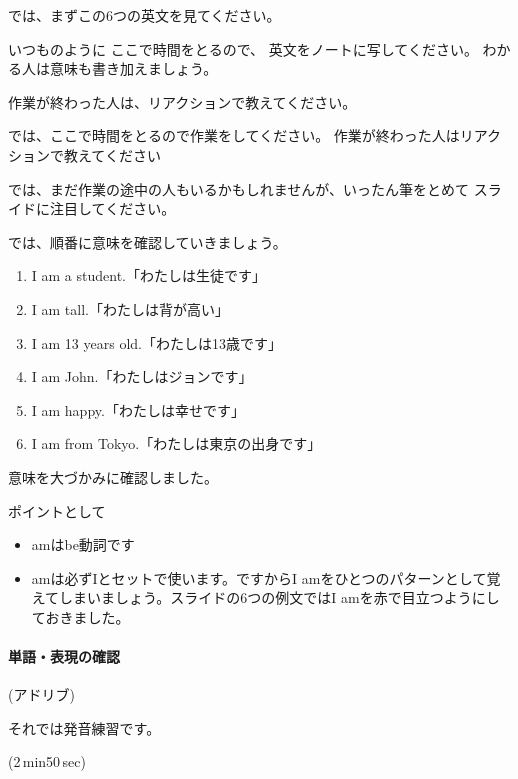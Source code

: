 \documentclass[book,jafontscale=0.9247]{jlreq}
\newcommand{\mySagyo}{%
\par%
\bigskip
では、ここで時間をとるので作業をしてください。
作業が終わった人はリアクションで教えてください\par%
\begin{minipage}[t]{.98\textwidth}
\mbox{}\hrulefill\mbox{}\par%
\mbox{}\hfill{}\raisebox{-.5\height}{作業}\hfill\mbox{}\par%
\mbox{}\hrulefill\mbox{}
\end{minipage}%
\par%
\bigskip%
では、まだ作業の途中の人もいるかもしれませんが、いったん筆をとめて
スライドに注目してください。%
\par%
\bigskip
}
\begin{document}
では、まずこの6つの英文を見てください。

いつものように
ここで時間をとるので、
英文をノートに写してください。
わかる人は意味も書き加えましょう。

作業が終わった人は、リアクションで教えてください。

\mySagyo

では、順番に意味を確認していきましょう。


\begin{enumerate}
 \item  I am a student.「わたしは生徒です」
 \item  I am tall.「わたしは背が高い」
 \item  I am 13 years old.「わたしは13歳です」
 \item  I am John.「わたしはジョンです」
 \item  I am happy.「わたしは幸せです」
 \item  I am from Tokyo.「わたしは東京の出身です」
\end{enumerate}

意味を大づかみに確認しました。

ポイントとして
\begin{itemize}
 \item amはbe動詞です
 \item amは必ずIとセットで使います。ですからI amをひとつのパターンとして覚えてしまいましょう。スライドの6つの例文ではI amを赤で目立つようにしておきました。
\end{itemize}


\paragraph{単語・表現の確認}
(アドリブ)

それでは発音練習です。

\faVolumeUp{}(2\,min50\,sec)
\newpage
\end{document}
